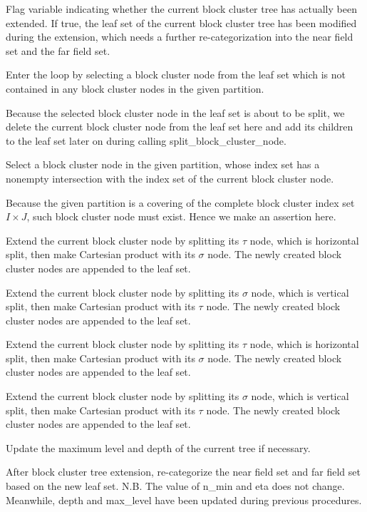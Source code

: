 Flag variable indicating whether the current block cluster tree has actually been extended. If true, the leaf set of the current block cluster tree has been modified during the extension, which needs a further re-\/categorization into the near field set and the far field set.

Enter the loop by selecting a block cluster node from the leaf set which is not contained in any block cluster nodes in the given partition.

Because the selected block cluster node in the leaf set is about to be split, we delete the current block cluster node from the leaf set here and add its children to the leaf set later on during calling {\ttfamily split\+\_\+block\+\_\+cluster\+\_\+node}.

Select a block cluster node in the given partition, whose index set has a nonempty intersection with the index set of the current block cluster node.

Because the given partition is a covering of the complete block cluster index set $I \times J$, such block cluster node must exist. Hence we make an assertion here.

Extend the current block cluster node by splitting its $\tau$ node, which is horizontal split, then make Cartesian product with its $\sigma$ node. The newly created block cluster nodes are appended to the leaf set.

Extend the current block cluster node by splitting its $\sigma$ node, which is vertical split, then make Cartesian product with its $\tau$ node. The newly created block cluster nodes are appended to the leaf set.

Extend the current block cluster node by splitting its $\tau$ node, which is horizontal split, then make Cartesian product with its $\sigma$ node. The newly created block cluster nodes are appended to the leaf set.

Extend the current block cluster node by splitting its $\sigma$ node, which is vertical split, then make Cartesian product with its $\tau$ node. The newly created block cluster nodes are appended to the leaf set.

Update the maximum level and depth of the current tree if necessary.

After block cluster tree extension, re-\/categorize the near field set and far field set based on the new leaf set. N.\+B. The value of {\ttfamily n\+\_\+min} and {\ttfamily eta} does not change. Meanwhile, {\ttfamily depth} and {\ttfamily max\+\_\+level} have been updated during previous procedures.

